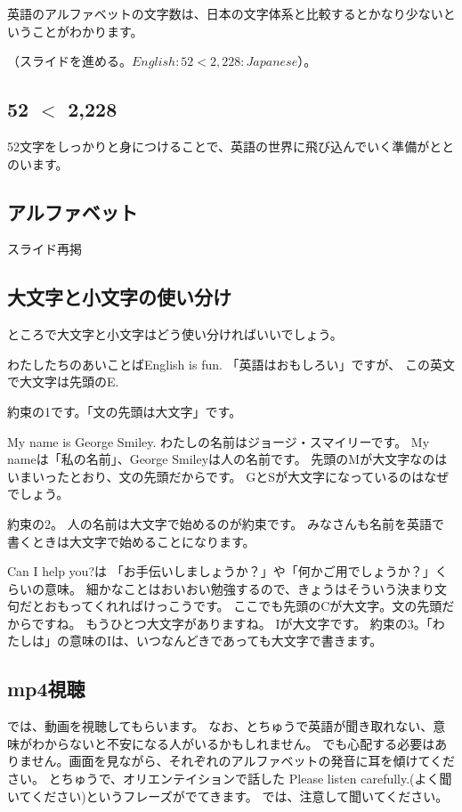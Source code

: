 \documentclass[12pt]{jlreq}
\begin{document}
英語のアルファベットの文字数は、日本の文字体系と比較するとかなり少ないということがわかります。


（スライドを進める。$English\colon{}52<2,228\colon{}Japanese$）。

\subsection{52 $<$ 2,228}
52文字をしっかりと身につけることで、英語の世界に飛び込んでいく準備がととのいます。

\subsection{アルファベット}

スライド再掲

\subsection{大文字と小文字の使い分け}

ところで大文字と小文字はどう使い分ければいいでしょう。

わたしたちのあいことばEnglish is fun.
「英語はおもしろい」ですが、
この英文で大文字は先頭のE.

約束の1です。「文の先頭は大文字」です。

My name is George Smiley.
わたしの名前はジョージ・スマイリーです。
My nameは「私の名前」、George Smileyは人の名前です。
先頭のMが大文字なのはいまいったとおり、文の先頭だからです。
GとSが大文字になっているのはなぜでしょう。

約束の2。
人の名前は大文字で始めるのが約束です。
みなさんも名前を英語で書くときは大文字で始めることになります。

Can I help you?は
「お手伝いしましょうか？」や「何かご用でしょうか？」くらいの意味。
細かなことはおいおい勉強するので、きょうはそういう決まり文句だとおもってくれればけっこうです。
ここでも先頭のCが大文字。文の先頭だからですね。
もうひとつ大文字がありますね。
Iが大文字です。
約束の3。「わたしは」の意味のIは、いつなんどきであっても大文字で書きます。




\subsection{mp4視聴}
では、動画を視聴してもらいます。
なお、とちゅうで英語が聞き取れない、意味がわからないと不安になる人がいるかもしれません。
でも心配する必要はありません。画面を見ながら、それぞれのアルファベットの発音に耳を傾けてください。
とちゅうで、オリエンテイションで話した
Please listen carefully.(よく聞いてください)というフレーズがでてきます。
では、注意して聞いてください。
\end{document}
